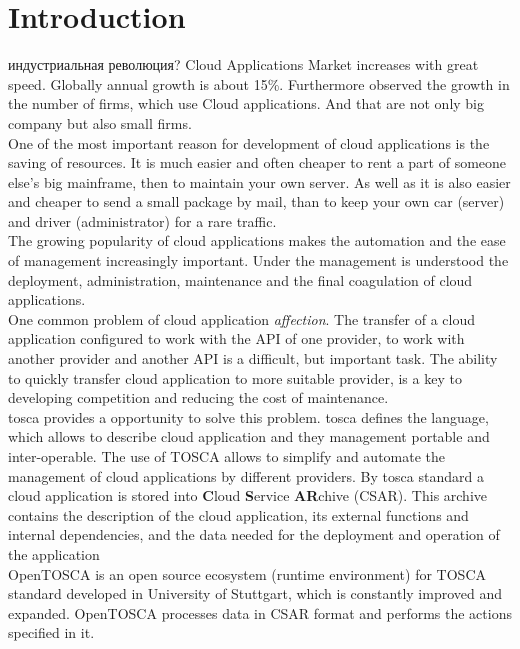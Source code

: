 
\chapter{Introduction}
индустриальная революция?
\fi
Cloud Applications Market increases with great speed. Globally annual growth is about 15\%. \cite*{statista_global}
Furthermore observed the growth in the number of firms, which use Cloud applications. And that are not only big company but also small firms. \cite*{destatis_2014, destatis_2016} \\ 
One of the most important reason for development of cloud applications is the saving of resources.
It is much easier and often cheaper to rent a part of someone else's big mainframe, then to maintain your own server.
As well as it is also easier and cheaper to send a small package by mail, than to keep your own car (server) and driver (administrator) for a rare traffic.\\ 
The growing popularity of cloud applications makes the automation and the ease of management increasingly important.
Under the management is understood the deployment, administration, maintenance and the final coagulation of cloud applications.\\
One common problem of cloud application \emph{affection}. The transfer of a cloud application configured to work with the API of one provider, to work with another provider and another API is a difficult, but important task. The ability to quickly transfer cloud application to more suitable provider, is a key to developing competition and reducing the cost of maintenance.\\ 
\gls{tosca} \cite*{TOSCA-v1.0} provides a opportunity to solve this problem. \gls{tosca} defines the language, which allows to describe cloud application and they management portable and inter-operable. 
The use of TOSCA allows to simplify and automate the management of cloud applications by different providers. By \gls{tosca} standard a cloud application is stored into \textbf{C}loud \textbf{S}ervice \textbf{AR}chive (CSAR).
This archive contains the description of the cloud application, its external functions and internal dependencies, and the data needed for the deployment and operation of the application\\
OpenTOSCA \cite*{OpenTOSCA} is an open source ecosystem (runtime environment) for TOSCA standard developed in University of Stuttgart, which is constantly improved and expanded.
OpenTOSCA processes data in CSAR format and performs the actions specified in it.\\
